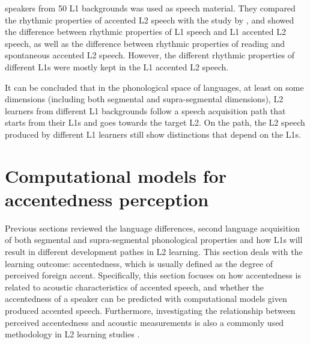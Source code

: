 speakers from 50 L1 backgrounds was used as speech material. They compared the rhythmic properties of accented L2 speech with the study by \cite{ramus1999correlates}, and showed the difference between rhythmic properties of L1 speech and L1 accented L2 speech, as well as the difference between rhythmic properties of reading and spontaneous accented L2 speech. However, the different rhythmic properties of different L1s were mostly kept in the L1 accented L2 speech.

It can be concluded that in the phonological space of languages, at least on some dimensions (including both segmental and supra-segmental dimensions), L2 learners from different L1 backgrounds follow a speech acquisition path that starts from their L1s and goes towards the target L2. On the path, the L2 speech produced by different L1 learners still show distinctions that depend on the L1s.

\section{Computational models for accentedness perception}
\label{sec:com_model}

Previous sections reviewed the language differences, second language acquisition of both segmental and supra-segmental phonological properties and how L1s will result in different development pathes in L2 learning. This section deals with the learning outcome: accentedness, which is usually defined as the degree of perceived foreign accent. Specifically, this section focuses on how accentedness is related to acoustic characteristics of accented speech, and whether the accentedness of a speaker can be predicted with computational models given produced accented speech. Furthermore, investigating the relationship between perceived accentedness and acoustic measurements is also a commonly used methodology in L2 learning studies \citep{ordin2015acquisition,saito2016second}.

